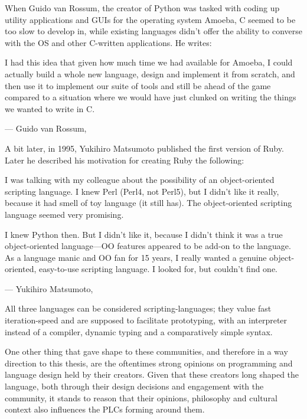 When Guido van Rossum, the creator of Python was tasked with coding up utility applications and GUIs for the operating
system Amoeba, C seemed to be too slow to develop in, while existing languages didn’t offer the ability to converse with
the OS and other C-written applications. He writes:

\begin{displayquote}
I had this idea that given how much time we had available for Amoeba, I could actually build a whole new language, design
and implement it from scratch, and then use it to implement our suite of tools and still be ahead of the game compared
to a situation where we would have just clunked on writing the things we wanted to write in C.

--- Guido van Rossum, \cite{severance_guido_2015}
\end{displayquote}

A bit later, in 1995, Yukihiro Matsumoto published the first version of Ruby. Later he described his motivation for
creating Ruby the following:

\begin{displayquote}
[...] I was talking with my colleague about the possibility of an object-oriented scripting language.
I knew Perl (Perl4, not Perl5), but I didn't like it really, because it had smell of toy language (it still has).
The object-oriented scripting language seemed very promising.

I knew Python then. But I didn't like it, because I didn't think it was a true object-oriented language---OO features
appeared to be add-on to the language. As a language manic and OO fan for 15 years, I really wanted a genuine object-oriented,
easy-to-use scripting language. I looked for, but couldn't find one.

--- Yukihiro Matsumoto, \cite{ruby_faq}
\end{displayquote}

All three languages can be considered scripting-languages; they value fast iteration-speed and are supposed to facilitate
prototyping, with an interpreter instead of a compiler, dynamic typing and a comparatively simple syntax.

One other thing that gave shape to these communities, and therefore in a way direction to this thesis, are the oftentimes
strong opinions on programming and language design held by their creators. Given that these creators long shaped
the language, both through their design decisions and engagement with the community, it stands to reason that their
opinions, philosophy and cultural context also influences the PLCs forming around them.

